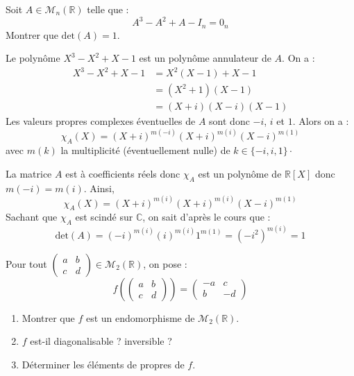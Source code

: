 \documentclass[a4paper,10pt]{report}
\begin{document}
\begin{Exa} Soit $A \in \mathcal{M}_{n}(\mathbb{R})$ telle que :
  \[
  A^{3} - A^{2} + A - I_n = 0_n
  \]
Montrer que $\textrm{det}(A) = 1$.
\end{Exa}

\corr Le polynôme $X^3-X^2+X-1$ est un polynôme annulateur de $A$. On a :
\begin{align*}
X^3-X^2+X-1 & = X^2(X-1)+X-1 \\
& = (X^2+1)(X-1) \\
& = (X+i)(X-i)(X-1)
\end{align*}
Les valeurs propres complexes éventuelles de $A$ sont donc $-i$, $i$ et $1$. Alors on a :
$$ \chi_A(X)= (X+i)^{m(-i)} (X+i)^{m(i)} (X-i)^{m(1)}$$
avec $m(k)$ la multiplicité (éventuellement nulle) de $k \in \lbrace -i, i ,1 \rbrace \cdot$

\medskip

\noindent La matrice $A$ est à coefficients réels donc $\chi_A$ est un polynôme de $\mathbb{R}[X]$ donc $m(-i)=m(i)$. Ainsi,
$$ \chi_A(X) = (X+i)^{m(i)} (X+i)^{m(i)} (X-i)^{m(1)}$$
Sachant que $\chi_A$ est scindé sur $\mathbb{C}$, on sait d'après le cours que :
$$ \textrm{det}(A) = (-i)^{m(i)} (i)^{m(i)} 1^{m(1)} = (-i^2)^{m(i)} = 1$$


\begin{Exa} Pour tout $\begin{pmatrix}
a & b \\
c & d 
\end{pmatrix} \in \mathcal{M}_2(\mathbb{R})$, on pose :
$$ f \left( \begin{pmatrix}
a & b \\
c & d 
\end{pmatrix} \right) = \begin{pmatrix}
-a & c \\
b & -d 
\end{pmatrix}$$

\begin{enumerate}
\item Montrer que $f$ est un endomorphisme de $\mathcal{M}_2(\mathbb{R})$.
\item $f$ est-il diagonalisable ? inversible ?
\item Déterminer les éléments de propres de $f$.
\end{enumerate}
\end{Exa}

\corr 
\end{document}
